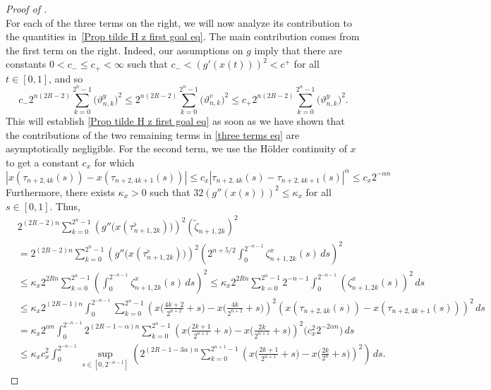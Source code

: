 \documentclass[10pt,a4paper]{amsart}
\def\wt{\widetilde}
\begin{document}
\begin{proof}[Proof of ]
\begin{equation}
	\end{equation}
	For each of the three terms on the right,  we will now analyze its contribution to the quantities in~\eqref{Prop tilde H z first goal eq}. 
	The main contribution comes from the first term on the right.	Indeed, our assumptions on $g$ imply that there are constants $0<c_-\le c_+<\infty$ such that $c_-<(g'(x(t)))^2<c^+$ for all $t\in[0,1]$, and so 	
	$$c_-2^{n(2{R}-2)}\sum_{k = 0}^{2^{n}-1}\big(\vartheta^y_{n,k}\big)^2\le 2^{n(2{R}-2)}\sum_{k = 0}^{2^{n}-1}\big(\vartheta^v_{n,k}\big)^2\le c_+2^{n(2{R}-2)}\sum_{k = 0}^{2^{n}-1}\big(\vartheta^y_{n,k}\big)^2.
	$$
	This will establish \eqref{Prop tilde H z first goal eq} as soon as
	we have shown that the contributions of the two remaining terms in \eqref{three terms eq} are asymptotically negligible.	For the second term, we use the H\"older continuity of $x$ to get a constant $c_x$ for which
	\begin{equation*}
		|x(\tau_{n+2,4k}(s))-x(\tau_{n+2,4k+1}(s))| \le c_x|\tau_{n+2,4k}(s) - \tau_{n+2,4k+1}(s)|^\alpha \le c_x2^{-\alpha n}
	\end{equation*}
	Furthermore,  there exists $\kappa_x > 0$ such that $32 (g''(x(s)))^2 \le \kappa_x$ for all $s\in[0,1]$. Thus,
	\begin{equation*}
		\begin{split}
			&2^{(2{R}-2)n}\sum_{k = 0}^{2^{n}-1}\left(g''\big(x(\tau^\flat_{n+1,2k})\big)\right)^2\left(\wt\zeta_{n+1,2k}
			\right)^2 \\
			&= 2^{(2{R}-2)n}\sum_{k = 0}^{2^{n}-1}\left(g''\big(x(\tau^\flat_{n+1,2k})\big)\right)^2\left(2^{n+5/2}\int_{0}^{2^{-n-1}}\zeta^{x}_{n+1,2k}(s)\,ds\right)^2\\
			&\le \kappa_x 2^{2{R}n}\sum_{k = 0}^{2^{n}-1}\left(\int_{0}^{2^{-n-1}}\zeta^{x}_{n+1,2k}(s)\,ds\right)^2 \le \kappa_x 2^{2{R}n}\sum_{k = 0}^{2^{n}-1}2^{-n-1}\int_{0}^{2^{-n-1}}\left(\zeta^{x}_{n+1,2k}(s)\right)^2\,ds \\
			&\le \kappa_x 2^{(2{R}-1)n}\int_{0}^{2^{-n-1}}\sum_{k = 0}^{2^{n}-1}\left(x\Big(\frac{4k+2}{2^{n+2}}+s\Big)-x\Big(\frac{4k}{2^{n+2}}+s\Big)\right)^2\left(x(\tau_{n+2,4k}(s))-x(\tau_{n+2,4k+1}(s))\right)^2\,ds \\
			&= \kappa_x 2^{\alpha n}\int_{0}^{2^{-n-1}}2^{(2{R}-1-\alpha)n}\sum_{k = 0}^{2^{n}-1}\left(x\Big(\frac{2k+1}{2^{n+1}}+s\Big)-x\Big(\frac{2k}{2^{n+1}}+s\Big)\right)^2\big(c^2_x2^{-2\alpha n}\big)\,ds \\
			&\le \kappa_x c^2_x \int_{0}^{2^{-n-1}}\sup_{s \in [0,2^{-n-1}]}\left(2^{(2{R}-1-3\alpha)n}\sum_{k = 0}^{2^{n+1}-1}\left(x\Big(\frac{2k+1}{2^{n+1}}+s\Big)-x\Big(\frac{2k}{2^{n}}+s\Big)\right)^2\right)\,ds.	\end{split}

\end{equation*}
\end{proof}
\end{document}
